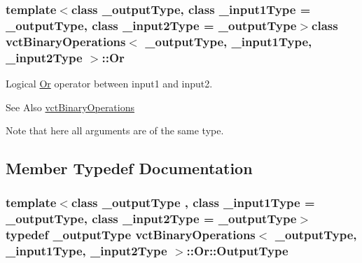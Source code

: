 \subsubsection*{template$<$class \-\_\-output\-Type, class \-\_\-input1\-Type = \-\_\-output\-Type, class \-\_\-input2\-Type = \-\_\-output\-Type$>$class vct\-Binary\-Operations$<$ \-\_\-output\-Type, \-\_\-input1\-Type, \-\_\-input2\-Type $>$\-::\-Or}

Logical \hyperlink{classvct_binary_operations_1_1_or}{Or} operator between input1 and input2. 

\begin{DoxySeeAlso}{See Also}
\hyperlink{classvct_binary_operations}{vct\-Binary\-Operations}
\end{DoxySeeAlso}
Note that here all arguments are of the same type. 

\subsection{Member Typedef Documentation}
\hypertarget{classvct_binary_operations_1_1_or_a5401f56c720be18225261374125626f9}{
\subsubsection[{Output\-Type}]{\setlength{\rightskip}{0pt plus 5cm}template$<$class \-\_\-output\-Type , class \-\_\-input1\-Type  = \-\_\-output\-Type, class \-\_\-input2\-Type  = \-\_\-output\-Type$>$ typedef \-\_\-output\-Type {\bf vct\-Binary\-Operations}$<$ \-\_\-output\-Type, \-\_\-input1\-Type, \-\_\-input2\-Type $>$\-::{\bf Or\-::\-Output\-Type}}}\label{classvct_binary_operations_1_1_or_a5401f56c720be18225261374125626f9}


